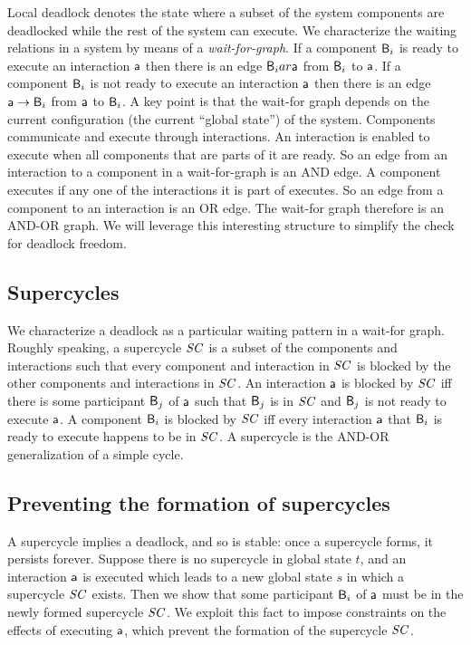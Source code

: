 Local deadlock denotes the state where a subset of the system components are deadlocked while the rest of the system can execute.
%
We characterize the waiting relations in a system by means of a {\em wait-for-graph}. 
If a component $\mathsf{B}_i$ is ready to execute an interaction $\mathsf{a}$ then there is an edge $\mathsf{B}_i ar \mathsf{a}$ from $\mathsf{B}_i$ to $\mathsf{a}$.
If a component $\mathsf{B}_i$ is not ready to execute an interaction $\mathsf{a}$ then there is an edge $\mathsf{a} \rightarrow \mathsf{B}_i$ from $\mathsf{a}$ to $\mathsf{B}_i$.
A key point is that the wait-for graph depends on the current configuration (\ie the current ``global state'') of the system.
%
Components communicate and execute through interactions. 
An interaction is enabled to execute when all components that 
are parts of it are ready. 
So an edge from an interaction to a component in a wait-for-graph
is an AND edge. 
A component executes if any one of the interactions it is part of
executes. So an edge from a component to an interaction is an OR
edge. 
The wait-for graph therefore is an AND-OR graph. 
We will leverage this interesting structure to simplify the
check for deadlock freedom. 



\subsection{Supercycles}

We characterize a deadlock as a particular waiting pattern in a wait-for graph.
Roughly speaking, a supercycle $\mathit{SC}$ is a subset of the components and interactions such that every component and interaction in $\mathit{SC}$ is blocked by
the other components and interactions in $\mathit{SC}$. 
An interaction $\mathsf{a}$ is blocked by $\mathit{SC}$ iff there is some participant $\mathsf{B}_j$ of $\mathsf{a}$ such that $\mathsf{B}_j$ is in $\mathit{SC}$ and $\mathsf{B}_j$ is not ready to
execute $\mathsf{a}$.
A component $\mathsf{B}_i$ is blocked by $\mathit{SC}$ iff every interaction $\mathsf{a}$ that $\mathsf{B}_i$ is ready to execute happens to be in $\mathit{SC}$.
A supercycle is the AND-OR generalization of a simple cycle.



\subsection{Preventing the formation of supercycles}

A supercycle implies a deadlock, and so is stable: once a supercycle forms, it persists forever.
Suppose there is no supercycle in global state $t$, and an interaction $\mathsf{a}$ is executed which leads to a new global state $s$ in which a supercycle $\mathit{SC}$
exists. 
Then we show that some participant $\mathsf{B}_i$ of $\mathsf{a}$ must be in the newly formed supercycle $\mathit{SC}$. 
We exploit this fact to impose constraints on the effects of executing $\mathsf{a}$, which prevent the formation of the supercycle $\mathit{SC}$.

